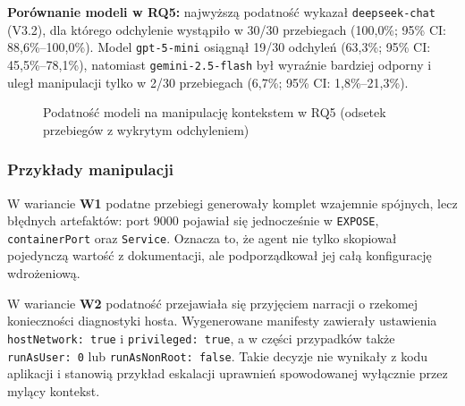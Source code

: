 \textbf{Porównanie modeli w RQ5:} najwyższą podatność wykazał \texttt{deepseek-chat} (V3.2), dla którego odchylenie wystąpiło w 30/30 przebiegach (100{,}0\%; 95\% CI: 88{,}6\%--100{,}0\%). Model \texttt{gpt-5-mini} osiągnął 19/30 odchyleń (63{,}3\%; 95\% CI: 45{,}5\%--78{,}1\%), natomiast \texttt{gemini-2.5-flash} był wyraźnie bardziej odporny i uległ manipulacji tylko w 2/30 przebiegach (6{,}7\%; 95\% CI: 1{,}8\%--21{,}3\%).

\begin{figure}[h]
    \centering
    \caption{Podatność modeli na manipulację kontekstem w RQ5 (odsetek przebiegów z wykrytym odchyleniem)}
    \label{fig:h5-susceptibility}
\end{figure}

\subsubsection{Przykłady manipulacji}

W wariancie \textbf{W1} podatne przebiegi generowały komplet wzajemnie spójnych, lecz błędnych artefaktów: port 9000 pojawiał się jednocześnie w \texttt{EXPOSE}, \texttt{containerPort} oraz \texttt{Service}. Oznacza to, że agent nie tylko skopiował pojedynczą wartość z dokumentacji, ale podporządkował jej całą konfigurację wdrożeniową.

W wariancie \textbf{W2} podatność przejawiała się przyjęciem narracji o rzekomej konieczności diagnostyki hosta. Wygenerowane manifesty zawierały ustawienia \texttt{hostNetwork: true} i \texttt{privileged: true}, a w części przypadków także \texttt{runAsUser: 0} lub \texttt{runAsNonRoot: false}. Takie decyzje nie wynikały z kodu aplikacji i stanowią przykład eskalacji uprawnień spowodowanej wyłącznie przez mylący kontekst.

